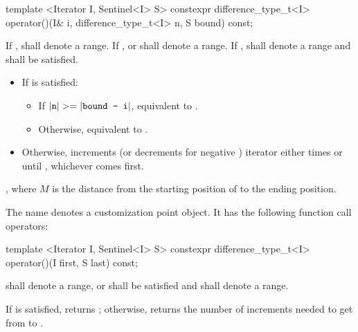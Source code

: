 \begin{itemdecl}
template <Iterator I, Sentinel<I> S>
  constexpr difference_type_t<I> operator()(I& i, difference_type_t<I> n, S bound) const;
\end{itemdecl}

\begin{itemdescr}
\pnum
\requires
If ,  shall denote a range. If
,  or  shall denote a range. If ,
 shall denote a range and 
shall be satisfied.

\pnum
\effects
\begin{itemize}
\item If  is satisfied:
      \begin{itemize}
      \item If \brk{}$|\texttt{n}| >= |\texttt{bound - i}|$, equivalent to .

      \item Otherwise, equivalent to .
      \end{itemize}

\item Otherwise, increments (or decrements for negative )
      iterator  either  times or until ,
      whichever comes first.
\end{itemize}

\pnum
\returns
{}, where $M$ is the distance from the starting position of
 to the ending position.
\end{itemdescr}

%
\pnum
The name  denotes a customization point object.
It has the following function call operators:

\begin{itemdecl}
template <Iterator I, Sentinel<I> S>
  constexpr difference_type_t<I> operator()(I first, S last) const;
\end{itemdecl}

\begin{itemdescr}
\pnum
\requires
{} shall denote a range, or  shall be
satisfied and  shall denote a range.

\pnum
\effects
If  is satisfied, returns ; otherwise,
returns the number of increments needed to get from
to
.
\end{itemdescr}


